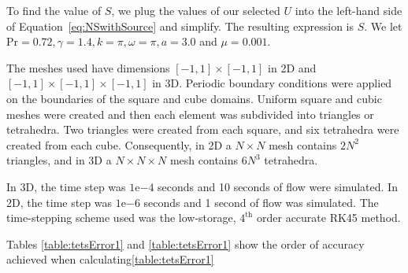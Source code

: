 To find the value of $S$, we plug the values of our selected $U$ into the left-hand side of Equation~\eqref{eq:NSwithSource} and simplify. The resulting expression is $S$. 
We let Pr$=0.72, \gamma = 1.4, k = \pi, \omega = \pi, a = 3.0$ and $\mu = 0.001$.

The meshes used have dimensions $[-1,1] \times [-1,1]$ in 2D and $[-1,1] \times [-1,1] \times [-1,1]$ in 3D. Periodic boundary conditions were applied on the boundaries of the square and cube domains. Uniform square and cubic meshes were created and then each element was subdivided into triangles or tetrahedra. Two triangles were created from each square, and six tetrahedra were created from each cube. Consequently, in 2D a $N \times N$ mesh contains $2N^2$ triangles, and in 3D a $N \times N \times N$ mesh contains $6N^3$ tetrahedra. 


In 3D, the time step was $1$e$-4$ seconds and 10 seconds of flow were simulated. In 2D, the time step was $1$e$-6$ seconds and 1 second of flow was simulated. The time-stepping scheme used was the low-storage, $4^\text{th}$ order accurate RK45 method.







Tables \eqref{table:tetsError1} and \eqref{table:tetsError1} show the order of accuracy achieved when calculating\eqref{table:tetsError1}

